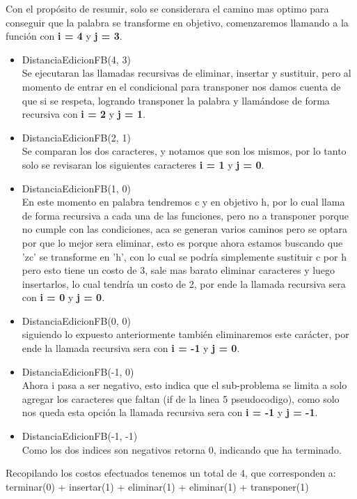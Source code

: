 Con el propósito de resumir, solo se considerara el camino mas optimo para conseguir que la palabra se transforme en objetivo, comenzaremos llamando a la función con \textbf{i = 4} y \textbf{j = 3}.
\begin{itemize}
    \item DistanciaEdicionFB(4, 3)\\Se ejecutaran las llamadas recursivas de eliminar, insertar y sustituir, pero al momento de entrar en el condicional para transponer nos damos cuenta de que si se respeta, logrando transponer la palabra y llamándose de forma recursiva con \textbf{i = 2} y \textbf{j = 1}.
    \item DistanciaEdicionFB(2, 1)\\Se comparan los dos caracteres, y notamos que son los mismos, por lo tanto solo se revisaran los siguientes caracteres \textbf{i = 1} y \textbf{j = 0}.
    \item DistanciaEdicionFB(1, 0)\\En este momento en palabra tendremos c y en objetivo h, por lo cual llama de forma recursiva a cada una de las funciones, pero no a transponer porque no cumple con las condiciones, aca se generan varios caminos pero se optara por que lo mejor sera eliminar, esto es porque ahora estamos buscando que 'zc' se transforme en 'h', con lo cual se podría simplemente sustituir c por h pero esto tiene un costo de 3, sale mas barato eliminar caracteres y luego insertarlos, lo cual tendría un costo de 2, por ende la llamada recursiva sera con \textbf{i = 0} y \textbf{j = 0}.
    \item DistanciaEdicionFB(0, 0)\\siguiendo lo expuesto anteriormente también eliminaremos este carácter, por ende la llamada recursiva sera con \textbf{i = -1} y \textbf{j = 0}.
    \item DistanciaEdicionFB(-1, 0)\\Ahora i pasa a ser negativo, esto indica que el sub-problema se limita a solo agregar los caracteres que faltan (if de la linea 5 pseudocodigo), como solo nos queda esta opción  la llamada recursiva sera con \textbf{i = -1} y \textbf{j = -1}.
    \item DistanciaEdicionFB(-1, -1)\\Como los dos indices son negativos retorna 0, indicando que ha terminado.
\end{itemize}
Recopilando los costos efectuados tenemos un total de 4, que corresponden a:\\
terminar(0) + insertar(1) + eliminar(1) + eliminar(1) + transponer(1)